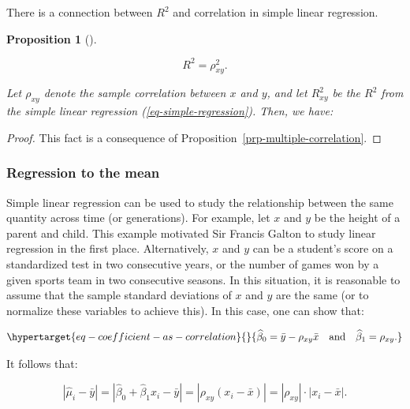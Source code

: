 \documentclass[
  11pt,
  letterpaper,
  oneside]{book}
\theoremstyle{definition}
\theoremstyle{plain}
\theoremstyle{plain}
\newtheorem{proposition}{Proposition}[chapter]
\theoremstyle{plain}
\theoremstyle{remark}
\begin{document}
There is a connection between \(R^2\) and correlation in simple linear
regression.

\begin{proposition}[]\protect\hypertarget{prp-R2-correlation}{}\label{prp-R2-correlation}

\[
R^2 = \rho_{xy}^2.
\]

Let \(\rho_{xy}\) denote the sample correlation between \(x\) and \(y\),
and let \(R^2_{xy}\) be the \(R^2\) from the simple linear regression
(\ref{eq-simple-regression}). Then, we have:

\end{proposition}

\begin{proof}

This fact is a consequence of
Proposition~\ref{prp-multiple-correlation}.

\end{proof}

\hypertarget{regression-to-the-mean}{%
\subsubsection{Regression to the mean}\label{regression-to-the-mean}}

Simple linear regression can be used to study the relationship between
the same quantity across time (or generations). For example, let \(x\)
and \(y\) be the height of a parent and child. This example motivated
Sir Francis Galton to study linear regression in the first place.
Alternatively, \(x\) and \(y\) can be a student's score on a
standardized test in two consecutive years, or the number of games won
by a given sports team in two consecutive seasons. In this situation, it
is reasonable to assume that the sample standard deviations of \(x\) and
\(y\) are the same (or to normalize these variables to achieve this). In
this case, one can show that:

\begin{equation}\protect\hypertarget{eq-coefficient-as-correlation}{}{
\widehat{\beta}_0 = \bar{y} - \rho_{xy} \bar{x} \quad \text{and} \quad \widehat{\beta}_1 = \rho_{xy}.
}\label{eq-coefficient-as-correlation}\end{equation}

It follows that:

\[
|\widehat{\mu}_i - \bar{y}| = |\widehat{\beta}_0 + \widehat{\beta}_1 x_i - \bar{y}| = |\rho_{xy}(x_i - \bar{x})| = |\rho_{xy}| \cdot |x_i - \bar{x}|.
\]
\end{document}
